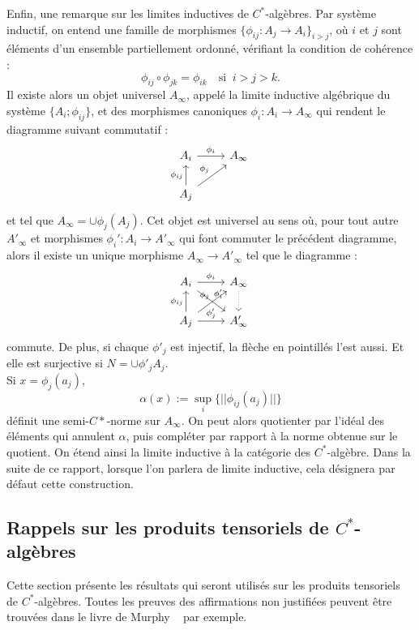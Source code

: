Enfin, une remarque sur les limites inductives de $C^*$-algèbres. Par système inductif, on entend une famille de morphismes $\{\phi_{ij}:A_j\rightarrow A_i\}_{i>j}$, où $i$ et $j$ sont éléments d'un ensemble partiellement ordonné, vérifiant la condition de cohérence :
\[\phi_{ij}\circ\phi_{jk}=\phi_{ik}\quad \text{si }\ i>j>k.\]
Il existe alors un objet universel $A_\infty$, appelé la limite inductive algébrique du système $\{A_i; \phi_{ij}\}$, et des morphismes canoniques $\phi_i : A_i \rightarrow A_\infty$ qui rendent le diagramme suivant commutatif :
\[\begin{tikzcd} A_i \arrow{r}{\phi_i} & A_\infty \\
			A_j \arrow{ur}{\phi_j}\arrow{u}{\phi_{ij}} & 
\end{tikzcd}\]
et tel que $A_\infty = \cup \phi_j(A_j)$. Cet objet est universel au sens où, pour tout autre $A'_\infty$ et morphismes $\phi_i' : A_i\rightarrow A'_\infty$ qui font commuter le précédent diagramme, alors il existe un unique morphisme $A_\infty \rightarrow A'_\infty$ tel que le diagramme :
\[\begin{tikzcd}A_i \arrow{r}{\phi_i}\arrow{dr}{\phi'_i}& A_\infty\arrow[dotted]{d} \\
		    A_j \arrow{u}{\phi_{ij}}\arrow{ur}{\phi_j}\arrow{r}{\phi'_j}& A'_\infty
\end{tikzcd}\] 
commute. De plus, si chaque $\phi'_j$ est injectif, la flèche en pointillés l'est aussi. Et elle est surjective si $N= \cup \phi'_j A_j$. \\

Si $x=\phi_j(a_j)$,
\[\alpha(x):=\sup_i\{||\phi_{ij}(a_j)||\}\]
définit une semi-$C*$-norme sur $A_\infty$. On peut alors quotienter par l'idéal des éléments qui annulent $\alpha$, puis compléter par rapport à la norme obtenue sur le quotient. On étend ainsi la limite inductive à la catégorie des $C^*$-algèbre. Dans la suite de ce rapport, lorsque l'on parlera de limite inductive, cela désignera par défaut cette construction.
 
\subsection{Rappels sur les produits tensoriels de $C^*$-algèbres}

Cette section présente les résultats qui seront utilisés sur les produits tensoriels de $C^*$-algèbres. Toutes les preuves des affirmations non justifiées peuvent être trouvées dans le livre de Murphy ~\cite{Murphy} par exemple.\\

